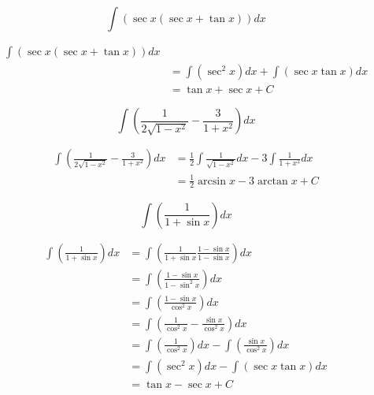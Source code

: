 \documentclass[a4paper, titlepage]{article}
\begin{document}
\begin{Exercise}
    \[\int \left( \sec x \left( \sec x + \tan x \right) \right) dx\]
\cite{anton-bivens-davis}
\end{Exercise}

\begin{Answer}
\begin{align*}
    \int \left( \sec x \left( \sec x + \tan x \right) \right) dx \\
    &= \int \left( \sec^2 x \right) dx + \int \left( \sec x \tan x \right) dx \\
    &= \tan x + \sec x + C
\end{align*}
\end{Answer}

\begin{Exercise}
    \[\int \left( \frac{1}{2 \sqrt{1 - x^2}} - \frac{3}{1 + x^2} \right) dx\]
\cite{anton-bivens-davis}
\end{Exercise}

\begin{Answer}
\begin{align*}
    \int \left( \frac{1}{2 \sqrt{1 - x^2}} - \frac{3}{1 + x^2} \right) dx
    &= \frac{1}{2} \int \frac{1}{\sqrt{1 - x^2}} dx
    - 3 \int \frac{1}{1 + x^2} dx \\
    &= \frac{1}{2} \arcsin x - 3 \arctan x + C
\end{align*}
\end{Answer}

\begin{Exercise}
\[\int \left( \frac{1}{1 + \sin x} \right) dx\]
\cite{anton-bivens-davis}
\end{Exercise}

\begin{Answer}
\begin{align*}
    \int \left( \frac{1}{1 + \sin x} \right) dx
    &= \int \left( \frac{1}{1 + \sin x} \frac{1 - \sin x}{1 - \sin x} \right) dx \\
    &= \int \left( \frac{1 - \sin x}{1 - \sin^2 x} \right) dx \\
    &= \int \left( \frac{1 - \sin x}{\cos^2 x} \right) dx \\
    &= \int \left( \frac{1}{\cos^2 x} - \frac{\sin x}{\cos^2 x} \right) dx \\
    &= \int \left( \frac{1}{\cos^2 x} \right) dx - \int \left( \frac{\sin x}{\cos^2 x} \right) dx \\
    &= \int \left( \sec^2 x \right) dx - \int \left( \sec x \tan x \right) dx \\
    &= \tan x - \sec x + C
\end{align*}
\end{Answer}
\end{document}
